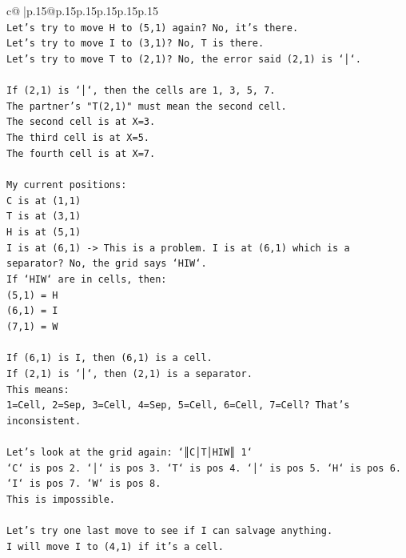 \documentclass{article}
\begin{document}
{\begin{supertabular}{c@{$\;$}|p{.15\linewidth}@{}p{.15\linewidth}p{.15\linewidth}p{.15\linewidth}p{.15\linewidth}p{.15\linewidth}}
{{{\\ 
\texttt{Let's try to move H to (5,1) again? No, it's there.} \\
\texttt{Let's try to move I to (3,1)? No, T is there.} \\
\texttt{Let's try to move T to (2,1)? No, the error said (2,1) is `│`.} \\
\\ 
\texttt{If (2,1) is `│`, then the cells are 1, 3, 5, 7.} \\
\texttt{The partner's "T(2,1)" must mean the second cell.} \\
\texttt{The second cell is at X=3.} \\
\texttt{The third cell is at X=5.} \\
\texttt{The fourth cell is at X=7.} \\
\\ 
\texttt{My current positions:} \\
\texttt{C is at (1,1)} \\
\texttt{T is at (3,1)} \\
\texttt{H is at (5,1)} \\
\texttt{I is at (6,1) {-}> This is a problem. I is at (6,1) which is a separator? No, the grid says `HIW`.} \\
\texttt{If `HIW` are in cells, then:} \\
\texttt{(5,1) = H} \\
\texttt{(6,1) = I} \\
\texttt{(7,1) = W} \\
\\ 
\texttt{If (6,1) is I, then (6,1) is a cell.} \\
\texttt{If (2,1) is `│`, then (2,1) is a separator.} \\
\texttt{This means:} \\
\texttt{1=Cell, 2=Sep, 3=Cell, 4=Sep, 5=Cell, 6=Cell, 7=Cell? That's inconsistent.} \\
\\ 
\texttt{Let's look at the grid again: `║C│T│HIW║ 1`} \\
\texttt{`C` is pos 2. `│` is pos 3. `T` is pos 4. `│` is pos 5. `H` is pos 6. `I` is pos 7. `W` is pos 8.} \\
\texttt{This is impossible.} \\
\\ 
\texttt{Let's try one last move to see if I can salvage anything.} \\
\texttt{I will move I to (4,1) if it's a cell.} \\
}}}
\end{supertabular}}
\end{document}
